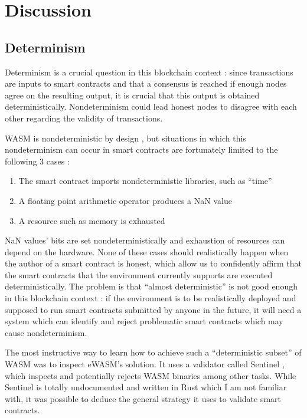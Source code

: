\documentclass[11pt, a4paper, twoside, openright]{article}
\begin{document}
\section{Discussion}

\subsection{Determinism}

Determinism is a crucial question in this blockchain context : since transactions are inputs to smart contracts and that a consensus is reached if enough nodes agree on the resulting output, it is crucial that this output is obtained deterministically. Nondeterminism could lead honest nodes to disagree with each other regarding the validity of transactions.

WASM is nondeterministic by design \cite{nondeterminism}, but situations in which this nondeterminism can occur in smart contracts are fortunately limited to the following 3 cases :

\begin{enumerate}

\itemsep0em

 \item The smart contract imports nondeterministic libraries, such as ``time''
 \item A floating point arithmetic operator produces a NaN value
 \item A resource such as memory is exhausted
 
\end{enumerate} 
 
NaN values' bits are set nondeterministically and exhaustion of resources can depend on the hardware. None of these cases should realistically happen when the author of a smart contract is honest, which allow us to confidently affirm that the smart contracts that the environment currently supports are executed deterministically. The problem is that ``almost deterministic'' is not good enough in this blockchain context : if the environment is to be realistically deployed and supposed to run smart contracts submitted by anyone in the future, it will need a system which can identify and reject problematic smart contracts which may cause nondeterminism.

The most instructive way to learn how to achieve such a ``deterministic subset'' of WASM was to inspect eWASM's solution. It uses a validator called Sentinel \cite{sentinel}, which inspects and potentially rejects WASM binaries among other tasks. While Sentinel is totally undocumented and written in Rust which I am not familiar with, it was possible to deduce the general strategy it uses to validate smart contracts.
\end{document}
